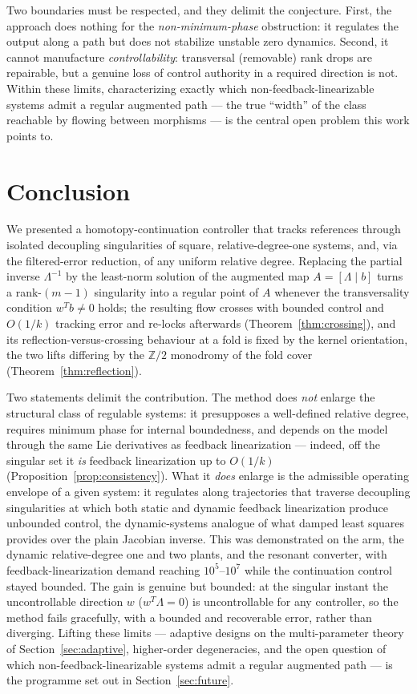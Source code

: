 \documentclass[11pt,american]{article}
\theoremstyle{definition}
\theoremstyle{plain}
\theoremstyle{remark}
\begin{document}
Two boundaries must be respected, and they delimit the conjecture. First, the approach does nothing for the \emph{non-minimum-phase} obstruction: it regulates the output along a path but does not stabilize unstable zero dynamics. Second, it cannot manufacture \emph{controllability}: transversal (removable) rank drops are repairable, but a genuine loss of control authority in a required direction is not. Within these limits, characterizing exactly which non-feedback-linearizable systems admit a regular augmented path --- the true ``width'' of the class reachable by flowing between morphisms --- is the central open problem this work points to.


\section{Conclusion}\label{sec:conclusion}

We presented a homotopy-continuation controller that tracks references through isolated decoupling singularities of square, relative-degree-one systems, and, via the filtered-error reduction, of any uniform relative degree. Replacing the partial inverse $\Lambda^{-1}$ by the least-norm solution of the augmented map $A = [\Lambda \mid b]$ turns a rank-$(m{-}1)$ singularity into a regular point of $A$ whenever the transversality condition $w^Tb \ne 0$ holds; the resulting flow crosses with bounded control and $O(1/k)$ tracking error and re-locks afterwards (Theorem~\ref{thm:crossing}), and its reflection-versus-crossing behaviour at a fold is fixed by the kernel orientation, the two lifts differing by the $\mathbb Z/2$ monodromy of the fold cover (Theorem~\ref{thm:reflection}).

Two statements delimit the contribution. The method does \emph{not} enlarge the structural class of regulable systems: it presupposes a well-defined relative degree, requires minimum phase for internal boundedness, and depends on the model through the same Lie derivatives as feedback linearization --- indeed, off the singular set it \emph{is} feedback linearization up to $O(1/k)$ (Proposition~\ref{prop:consistency}). What it \emph{does} enlarge is the admissible operating envelope of a given system: it regulates along trajectories that traverse decoupling singularities at which both static and dynamic feedback linearization produce unbounded control, the dynamic-systems analogue of what damped least squares provides over the plain Jacobian inverse. This was demonstrated on the arm, the dynamic relative-degree one and two plants, and the resonant converter, with feedback-linearization demand reaching $10^5$--$10^7$ while the continuation control stayed bounded. The gain is genuine but bounded: at the singular instant the uncontrollable direction $w$ ($w^T\Lambda = 0$) is uncontrollable for any controller, so the method fails gracefully, with a bounded and recoverable error, rather than diverging. Lifting these limits --- adaptive designs on the multi-parameter theory of Section~\ref{sec:adaptive}, higher-order degeneracies, and the open question of which non-feedback-linearizable systems admit a regular augmented path --- is the programme set out in Section~\ref{sec:future}.
\end{document}
